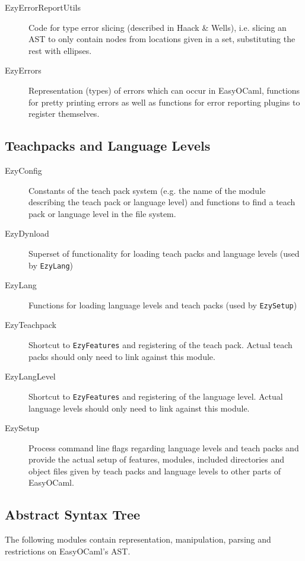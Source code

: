 \begin{description}
    \item[EzyErrorReportUtils] Code for type error slicing 
        (described in Haack \& Wells), i.e. slicing an AST to only 
        contain nodes from locations given in a set, substituting the 
        rest with ellipses.
    \item[EzyErrors] Representation (types) of errors which can 
        occur in EasyOCaml, functions for pretty printing errors as well 
        as functions for error reporting plugins to register themselves.
\end{description}


\subsection{Teachpacks and Language Levels}
\label{hd005004}
\begin{description}
    \item[EzyConfig] Constants of the teach pack system (e.g. the 
        name of the module describing the teach pack or language level) 
        and functions to find a teach pack or language level in the file 
        system.
    \item[EzyDynload] Superset of functionality for loading teach 
        packs and language levels (used by \texttt{EzyLang})
    \item[EzyLang] Functions for loading language levels and teach 
        packs (used by \texttt{EzySetup})
    \item[EzyTeachpack] Shortcut to \texttt{EzyFeatures} and 
        registering of the teach pack.  Actual teach packs should only 
        need to link against this module.
    \item[EzyLangLevel] Shortcut to \texttt{EzyFeatures} and 
        registering of the language level.  Actual language levels 
        should only need to link against this module.
    \item[EzySetup] Process command line flags regarding language 
        levels and teach packs and provide the actual setup of features, 
        modules, included directories and object files given by teach 
        packs and language levels to other parts of EasyOCaml.
\end{description}


\subsection{Abstract Syntax Tree}
\label{hd005005}
The following modules contain representation, manipulation, parsing and 
restrictions on EasyOCaml's AST.

